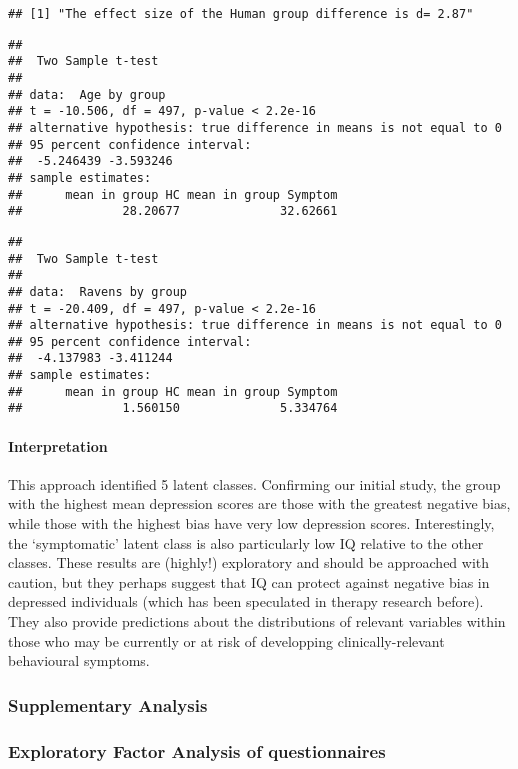 \documentclass[]{article}
\let\oldparagraph\paragraph
\renewcommand{\paragraph}[1]{\oldparagraph{#1}\mbox{}}
\begin{document}
\begin{verbatim}
## [1] "The effect size of the Human group difference is d= 2.87"
\end{verbatim}

\begin{verbatim}
## 
##  Two Sample t-test
## 
## data:  Age by group
## t = -10.506, df = 497, p-value < 2.2e-16
## alternative hypothesis: true difference in means is not equal to 0
## 95 percent confidence interval:
##  -5.246439 -3.593246
## sample estimates:
##      mean in group HC mean in group Symptom 
##              28.20677              32.62661
\end{verbatim}

\begin{verbatim}
## 
##  Two Sample t-test
## 
## data:  Ravens by group
## t = -20.409, df = 497, p-value < 2.2e-16
## alternative hypothesis: true difference in means is not equal to 0
## 95 percent confidence interval:
##  -4.137983 -3.411244
## sample estimates:
##      mean in group HC mean in group Symptom 
##              1.560150              5.334764
\end{verbatim}

\paragraph{Interpretation}\label{interpretation-4}

This approach identified 5 latent classes. Confirming our initial study,
the group with the highest mean depression scores are those with the
greatest negative bias, while those with the highest bias have very low
depression scores. Interestingly, the `symptomatic' latent class is also
particularly low IQ relative to the other classes. These results are
(highly!) exploratory and should be approached with caution, but they
perhaps suggest that IQ can protect against negative bias in depressed
individuals (which has been speculated in therapy research before). They
also provide predictions about the distributions of relevant variables
within those who may be currently or at risk of developping
clinically-relevant behavioural symptoms.

\subsubsection{Supplementary Analysis}\label{supplementary-analysis}

\subsubsection{Exploratory Factor Analysis of
questionnaires}\label{exploratory-factor-analysis-of-questionnaires}
\end{document}
